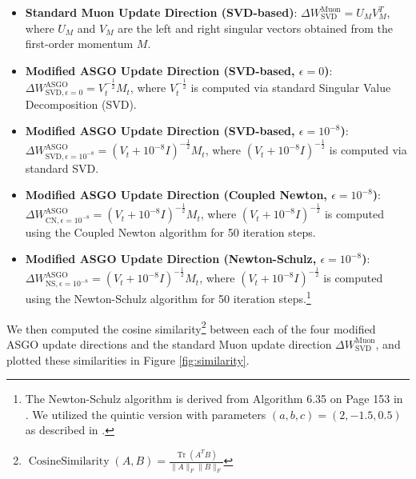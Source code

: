 \documentclass{article}
\theoremstyle{remark}
\begin{document}
\begin{itemize}
    \item \textbf{Standard Muon Update Direction (SVD-based)}: $\Delta W^{\text{Muon}}_{\text{SVD}} = U_M V_M^T$, where $U_M$ and $V_M$ are the left and right singular vectors obtained from the first-order momentum $M$.
    \item \textbf{Modified ASGO Update Direction (SVD-based, $\epsilon = 0$)}: $\Delta W^{\text{ASGO}}_{\text{SVD}, \epsilon=0} = V_t^{-\frac{1}{2}} M_t$, where $V_t^{-\frac{1}{2}}$ is computed via standard Singular Value Decomposition (SVD).
    \item \textbf{Modified ASGO Update Direction (SVD-based, $\epsilon = 10^{-8}$)}: $\Delta W^{\text{ASGO}}_{\text{SVD}, \epsilon=10^{-8}} = (V_t + 10^{-8} I)^{-\frac{1}{2}} M_t$, where $(V_t + 10^{-8} I)^{-\frac{1}{2}}$ is computed via standard SVD.
    \item \textbf{Modified ASGO Update Direction (Coupled Newton, $\epsilon = 10^{-8}$)}: $\Delta W^{\text{ASGO}}_{\text{CN}, \epsilon=10^{-8}} = (V_t + 10^{-8} I)^{-\frac{1}{2}} M_t$, where $(V_t + 10^{-8} I)^{-\frac{1}{2}}$ is computed using the Coupled Newton algorithm for 50 iteration steps. \cite{0c2c071b333446c49fabe4578a9776b8, shi2023distributed}
    \item \textbf{Modified ASGO Update Direction (Newton-Schulz, $\epsilon = 10^{-8}$)}: $\Delta W^{\text{ASGO}}_{\text{NS}, \epsilon=10^{-8}} = (V_t + 10^{-8} I)^{-\frac{1}{2}} M_t$, where $(V_t + 10^{-8} I)^{-\frac{1}{2}}$ is computed using the Newton-Schulz algorithm for 50 iteration steps.\footnote{The Newton-Schulz algorithm is derived from Algorithm 6.35 on Page 153 in \cite{0c2c071b333446c49fabe4578a9776b8}. We utilized the quintic version with parameters $(a,b,c) = (2, -1.5, 0.5)$ as described in \cite{jordan2024muon}.} \cite{0c2c071b333446c49fabe4578a9776b8, bernstein2024old, jordan2024muon}
\end{itemize}
We then computed the cosine similarity\footnote{$\operatorname{Cosine Similarity}(A,B) = \frac{\operatorname{Tr}(A^T B)}{\|A\|_F\|B\|_F}$} between each of the four modified ASGO update directions and the standard Muon update direction $\Delta W^{\text{Muon}}_{\text{SVD}}$, and plotted these similarities in Figure \ref{fig:similarity}.
\end{document}
